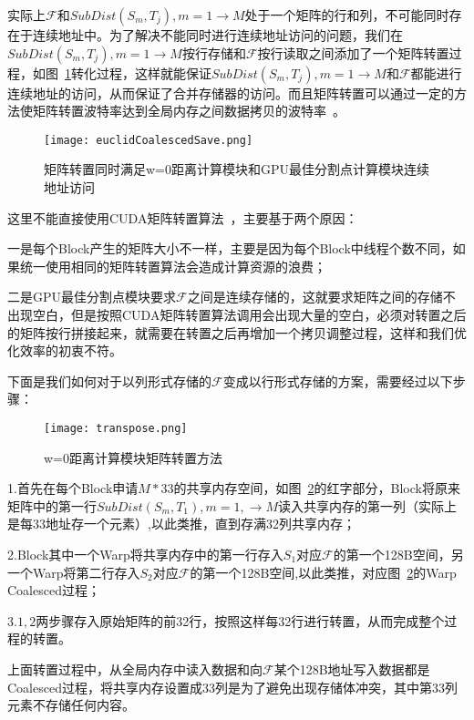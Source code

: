 实际上$\mathcal{F}$和$SubDist(S_m,T_j),m=1\to M$处于一个矩阵的行和列，不可能同时存在于连续地址中。为了解决不能同时进行连续地址访问的问题，我们在
$SubDist(S_m,T_j),m=1\to M$按行存储和$\mathcal{F}$按行读取之间添加了一个矩阵转置过程，如图~\ref{fig:euclidCoalescedSave}转化过程，这样就能保证$SubDist(S_m,T_j),m=1\to M$和$\mathcal{F}$都能进行连续地址的访问，从而保证了合并存储器的访问。而且矩阵转置可以通过一定的方法使矩阵转置波特率达到全局内存之间数据拷贝的波特率~\cite{ruetsch2009optimizing}。
\begin{figure}[H] %
	\centering
	\texttt{[image: euclidCoalescedSave.png]}
	\caption{矩阵转置同时满足w=0距离计算模块和GPU最佳分割点计算模块连续地址访问}
	\label{fig:euclidCoalescedSave}
\end{figure}

这里不能直接使用CUDA矩阵转置算法~\cite{ruetsch2009optimizing}，主要基于两个原因：

一是每个Block产生的矩阵大小不一样，主要是因为每个Block中线程个数不同，如果统一使用相同的矩阵转置算法会造成计算资源的浪费；

二是GPU最佳分割点模块要求$\mathcal{F}$之间是连续存储的，这就要求矩阵之间的存储不出现空白，但是按照CUDA矩阵转置算法调用会出现大量的空白，必须对转置之后的矩阵按行拼接起来，就需要在转置之后再增加一个拷贝调整过程，这样和我们优化效率的初衷不符。

下面是我们如何对于以列形式存储的$\mathcal{F}$变成以行形式存储的方案，需要经过以下步骤：

\begin{figure}[H] %
	\centering
	\texttt{[image: transpose.png]}
	\caption{w=0距离计算模块矩阵转置方法}
	\label{fig:transpose}
\end{figure}

1.首先在每个Block申请$M*33$的共享内存空间，如图~\ref{fig:transpose}的红字部分，Block将原来矩阵中的第一行$SubDist(S_m,T_1),m=1,\to M$读入共享内存的第一列（实际上是每33地址存一个元素）,以此类推，直到存满32列共享内存；

2.Block其中一个Warp将共享内存中的第一行存入$S_1$对应$\mathcal{F}$的第一个128B空间，另一个Warp将第二行存入$S_2$对应$\mathcal{F}$的第一个128B空间,以此类推，对应图~\ref{fig:transpose}的Warp Coalesced过程；

3.$1,2$两步骤存入原始矩阵的前32行，按照这样每32行进行转置，从而完成整个过程的转置。

上面转置过程中，从全局内存中读入数据和向$\mathcal{F}$某个128B地址写入数据都是Coalesced过程，将共享内存设置成33列是为了避免出现存储体冲突，其中第33列元素不存储任何内容。


